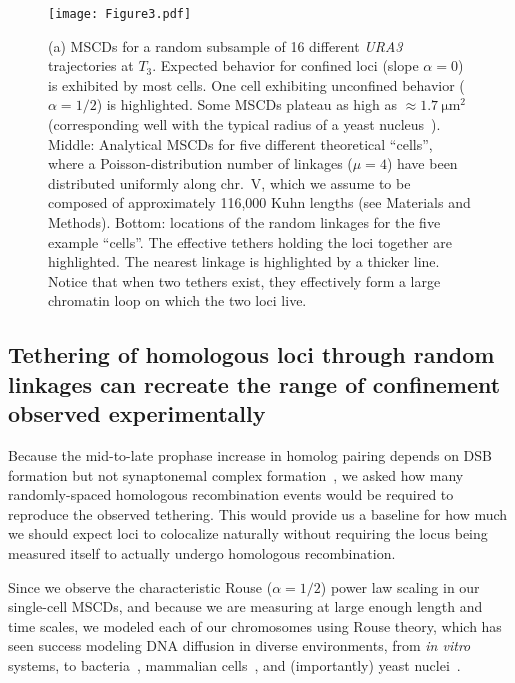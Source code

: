 \documentclass[9pt,twocolumn,twoside,lineno]{pnas-new}
\begin{document}
\begin{figure}[t!]
    \centering
    \texttt{[image: Figure3.pdf]}
    \caption{(a) MSCDs for a random subsample of 16 different \textit{URA3} trajectories at
    $T_3$. Expected behavior for confined loci
    (slope $\alpha = 0$) is exhibited by most cells.  One cell exhibiting unconfined behavior ($\alpha = 1/2$) is
    highlighted. Some MSCDs plateau as high as $\approx\SI{1.7}{\micro\meter\squared}$ (corresponding well with the typical radius of a yeast nucleus~\cite{??}). Middle: Analytical MSCDs for five different theoretical
    ``cells'', where a Poisson-distribution number of linkages ($\mu = 4$) have been distributed uniformly along chr.~V, which we assume to be composed of approximately 116,000 Kuhn lengths (see Materials and Methods).
    Bottom: locations of the random linkages for the five example ``cells''. The effective tethers holding the loci together are highlighted. The nearest linkage is highlighted by a thicker line. Notice that when two tethers exist, they effectively form a large chromatin loop on which the two loci live.
    }
    \label{fig:mscd-cells}
\end{figure}

\subsection*{Tethering of homologous loci through random linkages can recreate the range of confinement observed experimentally}

Because the mid-to-late prophase increase in homolog pairing depends on DSB formation but not synaptonemal complex formation~\cite{peoples2002,peoples2005,burgess2005}, we asked how many randomly-spaced homologous recombination events would be required to reproduce the observed tethering. This would provide us a baseline for how much we should expect loci to colocalize naturally without requiring the locus being measured itself to actually undergo homologous recombination.

Since we observe the characteristic Rouse ($\alpha = 1/2$) power law scaling in
our single-cell MSCDs, and because we are measuring at large enough length and time scales,
we modeled each of our chromosomes using Rouse theory, which has seen success modeling DNA diffusion in diverse
environments, from \textit{in vitro} systems, to bacteria~\cite{weber2010,weber2012a,weber2012b}, mammalian cells~\cite{??}, and (importantly) yeast nuclei~\cite{weber2012a,weber2012b,marshall2016,marshall2019}.
\end{document}
